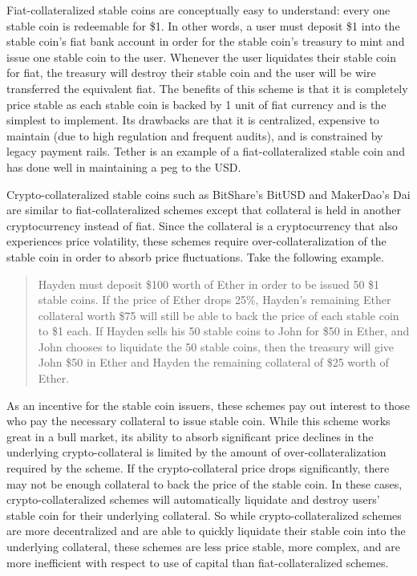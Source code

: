 Fiat-collateralized stable coins are conceptually easy to understand: every one stable coin is redeemable for \$1. In other words, a user must deposit \$1 into the stable coin's fiat bank account in order for the stable coin's treasury to mint and issue one stable coin to the user. Whenever the user liquidates their stable coin for fiat, the treasury will destroy their stable coin and the user will be wire transferred the equivalent fiat. The benefits of this scheme is that it is completely price stable as  each stable coin is backed by 1 unit of fiat currency and is the simplest to implement. Its drawbacks are that it is centralized, expensive to maintain (due to high regulation and frequent audits), and is constrained by legacy payment rails. Tether \cite{Tether16} is an example of a fiat-collateralized stable coin and has done well in maintaining a peg to the USD.

Crypto-collateralized stable coins such as BitShare's BitUSD \cite{BTS15} and MakerDao's Dai \cite{MDao17} are similar to fiat-collateralized schemes except that collateral is held in another cryptocurrency instead of fiat. Since the collateral is a cryptocurrency that also experiences price volatility, these schemes require over-collateralization of the stable coin in order to absorb price fluctuations. Take the following example.
%
\begin{quote}
Hayden must deposit \$100 worth of Ether in order to be issued 50 \$1 stable coins. If the price of Ether drops 25\%, Hayden's remaining Ether collateral worth \$75 will still be able to back the price of each stable coin to \$1 each. If Hayden sells his 50 stable coins to John for \$50 in Ether, and John chooses to liquidate the 50 stable coins, then the treasury will give John \$50 in Ether and Hayden the remaining collateral of \$25 worth of Ether.
\end{quote}
%
As an incentive for the stable coin issuers, these schemes pay out interest to those who pay the necessary collateral to issue stable coin. While this scheme works great in a bull market, its ability to absorb significant price declines in the underlying crypto-collateral is limited by the amount of over-collateralization required by the scheme. If the crypto-collateral price drops significantly, there may not be enough collateral to back the price of the stable coin. In these cases, crypto-collateralized schemes will automatically liquidate and destroy users' stable coin for their underlying collateral. So while crypto-collateralized schemes are more decentralized and are able to quickly liquidate their stable coin into the underlying collateral, these schemes are less price stable, more complex, and are more inefficient with respect to use of capital than fiat-collateralized schemes. 

